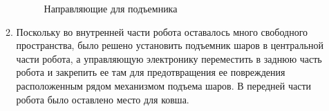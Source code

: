 \begin{enumerate}
\begin{enumerate}
\begin{figure}[H]
\begin{minipage}[h]{0.31\linewidth}
      	\end{minipage}
      	\caption{Направляющие для подъемника}
      \end{figure}
      
      \item Поскольку во внутренней части робота оставалось много свободного пространства, было решено установить подъемник шаров в центральной части робота, а управляющую электронику переместить в заднюю часть робота и закрепить ее там для предотвращения ее повреждения расположенным рядом механизмом подъема шаров. В передней части робота было оставлено место для ковша. \newline
       

\end{enumerate}
\end{enumerate}
